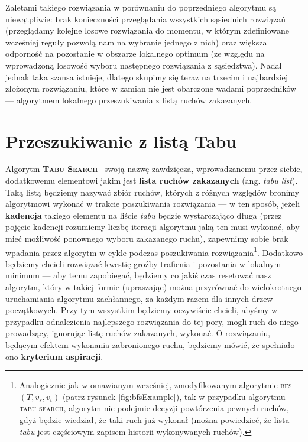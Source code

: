 Zaletami takiego rozwiązania w porównaniu do poprzedniego algorytmu są niewątpliwie: brak konieczności przeglądania wszystkich sąsiednich rozwiązań (przeglądamy kolejne losowe rozwiązania do momentu, w którym zdefiniowane wcześniej reguły pozwolą nam na wybranie jednego z nich) oraz większa odporność na pozostanie w obszarze lokalnego optimum (ze względu na wprowadzoną losowość wyboru następnego rozwiązania z sąsiedztwa). Nadal jednak taka szansa istnieje, dlatego skupimy się teraz na trzecim i najbardziej złożonym rozwiązaniu, które w zamian nie jest obarczone wadami poprzedników --- algorytmem lokalnego przeszukiwania z listą ruchów zakazanych.

\section{Przeszukiwanie z listą Tabu}

Algorytm \textsc{\textbf{Tabu Search}}~\cite{TabuSearch} swoją nazwę zawdzięcza, wprowadzanemu przez siebie, dodatkowemu elementowi jakim jest \textbf{lista ruchów zakazanych} (ang. \textit{tabu list}). Taką listą będziemy nazywać zbiór ruchów, których z różnych względów bronimy algorytmowi wykonać w trakcie poszukiwania rozwiązania --- w ten sposób, jeżeli \textbf{kadencja} takiego elementu na liście \textit{tabu} będzie wystarczająco długa (przez pojęcie kadencji rozumiemy liczbę iteracji algorytmu jaką ten musi wykonać, aby mieć możliwość ponownego wyboru zakazanego ruchu), zapewnimy sobie brak wpadania przez algorytm w cykle podczas poszukiwania rozwiązania\footnote{Analogicznie jak w omawianym wcześniej, zmodyfikowanym algorytmie \textsc{bfs} $\left( T, v_{s}, v_{t} \right)$ (patrz rysunek \ref{fig:bfsExample}), tak w przypadku algorytmu \textsc{tabu search}, algorytm nie podejmie decyzji powtórzenia pewnych ruchów, gdyż będzie wiedział, że taki ruch już wykonał (można powiedzieć, że lista \textit{tabu} jest częściowym zapisem historii wykonywanych ruchów).}. Dodatkowo będziemy chcieli rozwiązać kwestię groźby trafienia i pozostania w lokalnym minimum --- aby temu zapobiegać, będziemy co jakiś czas resetować nasz algorytm, który w takiej formie (upraszając) można przyrównać do wielokrotnego uruchamiania algorytmu zachłannego, za każdym razem dla innych drzew początkowych. Przy tym wszystkim będziemy oczywiście chcieli, abyśmy w przypadku odnalezienia najlepszego rozwiązania do tej pory, mogli ruch do niego prowadzący, ignorując listę ruchów zakazanych, wykonać. O rozwiązaniu, będącym efektem wykonania zabronionego ruchu, będziemy mówić, że spełniało ono \textbf{kryterium aspiracji}.

